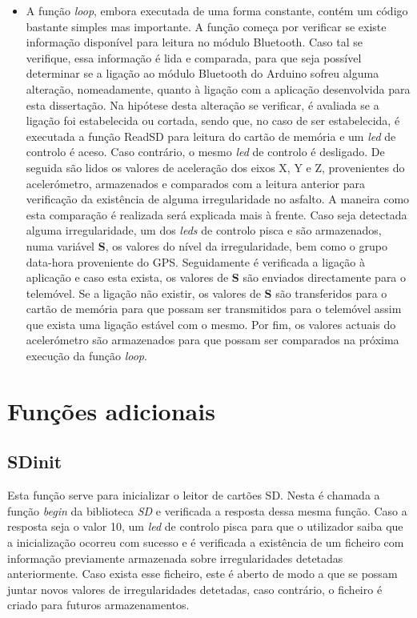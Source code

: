 \begin{itemize}
\item A função \emph{loop}, embora executada de uma forma constante, contém um código bastante simples mas importante.
A função começa por verificar se existe informação disponível para leitura no módulo Bluetooth.
Caso tal se verifique, essa informação é lida e comparada, para que seja possível determinar se a ligação ao módulo Bluetooth do Arduino sofreu alguma alteração, nomeadamente, quanto à ligação com a aplicação desenvolvida para esta dissertação.
Na hipótese desta alteração se verificar, é avaliada se a ligação foi estabelecida ou cortada, sendo que, no caso de ser estabelecida, é executada a função ReadSD para leitura do cartão de memória e um \emph{led} de controlo é aceso.
Caso contrário, o mesmo \emph{led} de controlo é desligado. 
De seguida são lidos os valores de aceleração dos eixos X, Y e Z, provenientes do acelerómetro, armazenados e comparados com a leitura anterior para verificação da existência de alguma irregularidade no asfalto.
A maneira como esta comparação é realizada será explicada mais à frente.
Caso seja detectada alguma irregularidade, um dos \emph{leds} de controlo pisca e são armazenados, numa variável \textbf{S}, os valores do nível da irregularidade, bem como o grupo data-hora proveniente do GPS.
Seguidamente é verificada a ligação à aplicação e caso esta exista, os valores de \textbf{S} são enviados directamente para o telemóvel.
Se a ligação não existir, os valores de \textbf{S} são transferidos para o cartão de memória para que possam ser transmitidos para o telemóvel assim que exista uma ligação estável com o mesmo.
Por fim, os valores actuais do acelerómetro são armazenados para que possam ser comparados na próxima execução da função \emph{loop}.
\end{itemize}

\section{Funções adicionais}
\label{sec:funcoes_adicionais}

\subsection{SD\textunderscore init}
\label{sub:sd_init}

Esta função serve para inicializar o leitor de cartões SD.
Nesta é chamada a função \emph{begin} da biblioteca \emph{SD} e verificada a resposta dessa mesma função.
Caso a resposta seja o valor 10, um \emph{led} de controlo pisca para que o utilizador saiba que a inicialização ocorreu com sucesso e é verificada a existência de um ficheiro com informação previamente armazenada sobre irregularidades detetadas anteriormente.
Caso exista esse ficheiro, este é aberto de modo a que se possam juntar novos valores de irregularidades detetadas, caso contrário, o ficheiro é criado para futuros armazenamentos.

